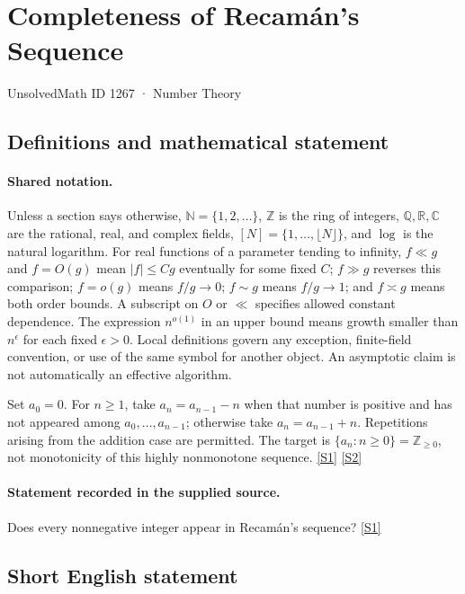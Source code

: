 \documentclass[11pt,a4paper]{article}
\newcommand{\N}{\mathbb{N}}
\newcommand{\Z}{\mathbb{Z}}
\newcommand{\Q}{\mathbb{Q}}
\newcommand{\R}{\mathbb{R}}
\newcommand{\C}{\mathbb{C}}
\newcommand{\sref}[2]{\hyperlink{source:#1:#2}{[S#2]}}
\begin{document}

\setcounter{section}{1266}

\section{Completeness of Recamán's Sequence}\label{1267}

{\small\sffamily UnsolvedMath ID 1267 · Number Theory}

\subsection{Definitions and mathematical statement}

\paragraph{Shared notation.}Unless a section says otherwise, $\N=\{1,2,\ldots\}$,
$\Z$ is the ring of integers, $\Q,\R,\C$ are the rational, real, and complex
fields, $[N]=\{1,\ldots,\lfloor N\rfloor\}$, and $\log$ is the natural
logarithm. For real functions of a parameter tending to infinity,
$f\ll g$ and $f=O(g)$ mean $|f|\leq Cg$ eventually for some fixed $C$;
$f\gg g$ reverses this comparison; $f=o(g)$ means $f/g\to0$;
$f\sim g$ means $f/g\to1$; and $f\asymp g$ means both order bounds.
A subscript on $O$ or $\ll$ specifies allowed constant dependence.
The expression $n^{o(1)}$ in an upper bound means growth smaller than
$n^\epsilon$ for each fixed $\epsilon>0$. Local definitions govern any
exception, finite-field convention, or use of the same symbol for another
object. An asymptotic claim is not automatically an effective algorithm.



Set $a_0=0$. For $n\geq1$, take $a_n=a_{n-1}-n$ when that number is positive and has not appeared among $a_0,\ldots,a_{n-1}$; otherwise take $a_n=a_{n-1}+n$. Repetitions arising from the addition case are permitted. The target is $\{a_n:n\geq0\}=\Z_{\geq0}$, not monotonicity of this highly nonmonotone sequence. \sref{1267}{1} \sref{1267}{2}

\paragraph{Statement recorded in the supplied source.}
Does every nonnegative integer appear in Recamán's sequence? \sref{1267}{1}

\subsection{Short English statement}
\end{document}
